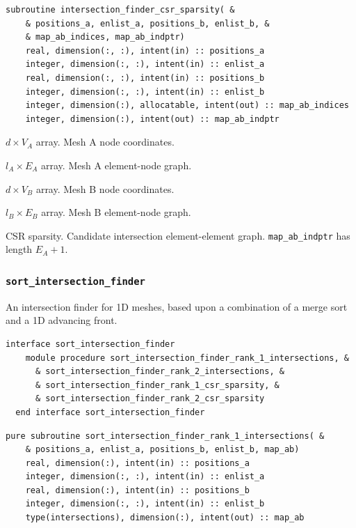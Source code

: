 \documentclass{article}
\begin{document}
\begin{lstlisting}[language=FORTRAN]
  subroutine intersection_finder_csr_sparsity( &
    & positions_a, enlist_a, positions_b, enlist_b, &
    & map_ab_indices, map_ab_indptr)
    real, dimension(:, :), intent(in) :: positions_a
    integer, dimension(:, :), intent(in) :: enlist_a
    real, dimension(:, :), intent(in) :: positions_b
    integer, dimension(:, :), intent(in) :: enlist_b
    integer, dimension(:), allocatable, intent(out) :: map_ab_indices
    integer, dimension(:), intent(out) :: map_ab_indptr
\end{lstlisting}

\begin{description}[font=\ttfamily\bfseries,leftmargin=2.2\parindent,labelindent=1.7\parindent,noitemsep]
  \item[positions\_a] $d \times V_A$ array. Mesh A node coordinates.
  \item[enlist\_a] $l_A \times E_A$ array. Mesh A element-node graph.
  \item[positions\_b] $d \times V_B$ array. Mesh B node coordinates.
  \item[enlist\_b] $l_B \times E_B$ array. Mesh B element-node graph.
  \item[map\_ab\_indices, map\_ab\_indptr] CSR sparsity. Candidate intersection
    element-element graph. \linebreak \verb+map_ab_indptr+ has length $E_A + 1$.
\end{description}

\subsubsection{\texttt{sort\_intersection\_finder}}\label{sect:sort_global}

An intersection finder for 1D meshes, based upon a combination of a merge sort
and a 1D advancing front.

\begin{lstlisting}[language=FORTRAN]
  interface sort_intersection_finder
    module procedure sort_intersection_finder_rank_1_intersections, &
      & sort_intersection_finder_rank_2_intersections, &
      & sort_intersection_finder_rank_1_csr_sparsity, &
      & sort_intersection_finder_rank_2_csr_sparsity
  end interface sort_intersection_finder
\end{lstlisting}

\begin{lstlisting}[language=FORTRAN]
  pure subroutine sort_intersection_finder_rank_1_intersections( &
    & positions_a, enlist_a, positions_b, enlist_b, map_ab)
    real, dimension(:), intent(in) :: positions_a
    integer, dimension(:, :), intent(in) :: enlist_a
    real, dimension(:), intent(in) :: positions_b
    integer, dimension(:, :), intent(in) :: enlist_b
    type(intersections), dimension(:), intent(out) :: map_ab
\end{lstlisting}
\end{document}
